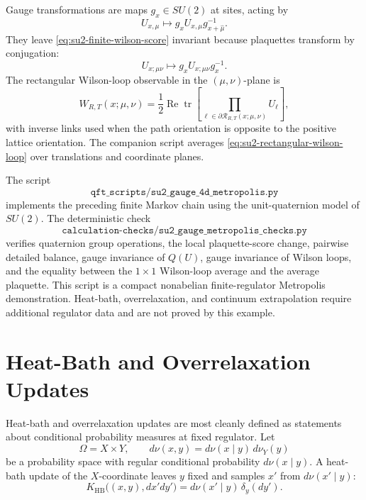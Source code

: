 Gauge transformations are maps \(g_x\in SU(2)\) at sites, acting by
\[
  U_{x,\mu}\longmapsto g_xU_{x,\mu}g^{-1}_{x+\hat\mu}.
\]
They leave \eqref{eq:su2-finite-wilson-score} invariant because plaquettes
transform by conjugation:
\[
  U_{x;\mu\nu}\longmapsto g_xU_{x;\mu\nu}g_x^{-1}.
\]
The rectangular Wilson-loop observable in the \((\mu,\nu)\)-plane is
\begin{equation}
  W_{R,T}(x;\mu,\nu)
  =
  \frac12\operatorname{Re}\operatorname{tr}
  \left[
    \prod_{\ell\in \partial \mathcal R_{R,T}(x;\mu,\nu)} U_\ell
  \right],
  \label{eq:su2-rectangular-wilson-loop}
\end{equation}
with inverse links used when the path orientation is opposite to the positive
lattice orientation.  The companion script averages
\eqref{eq:su2-rectangular-wilson-loop} over translations and coordinate
planes.

The script
\[
  \texttt{qft\_scripts/su2\_gauge\_4d\_metropolis.py}
\]
implements the preceding finite Markov chain using the unit-quaternion model
of \(SU(2)\).  The deterministic check
\[
  \texttt{calculation-checks/su2\_gauge\_metropolis\_checks.py}
\]
verifies quaternion group operations, the local plaquette-score change,
pairwise detailed balance, gauge invariance of \(Q(U)\), gauge invariance of
Wilson loops, and the equality between the \(1\times1\) Wilson-loop average
and the average plaquette.  This script is a compact nonabelian
finite-regulator Metropolis demonstration.  Heat-bath, overrelaxation, and
continuum extrapolation require additional regulator data and are not
proved by this example.

\section{Heat-Bath and Overrelaxation Updates}
\label{sec:heat-bath-overrelaxation-finite-regulator}

Heat-bath and overrelaxation updates are most cleanly defined as statements
about conditional probability measures at fixed regulator.  Let
\begin{equation}
  \Omega=X\times Y,\qquad
  d\nu(x,y)=d\nu(x\mid y)\,d\nu_Y(y)
  \label{eq:conditional-factorization}
\end{equation}
be a probability space with regular conditional probability
\(d\nu(x\mid y)\).  A heat-bath update of the \(X\)-coordinate leaves \(y\)
fixed and samples \(x'\) from \(d\nu(x'\mid y)\):
\begin{equation}
  K_{\mathrm{HB}}\bigl((x,y),d x' d y'\bigr)
  =
  d\nu(x'\mid y)\,\delta_y(dy').
  \label{eq:heat-bath-kernel}
\end{equation}

